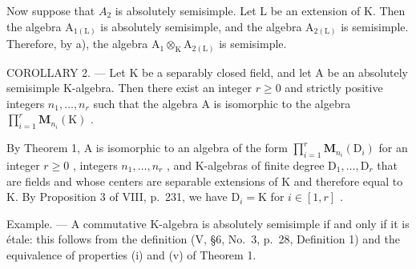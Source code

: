 Now suppose that \(A_{2}\) is absolutely semisimple. Let L be an extension of K. Then the algebra \(\mathrm{A}_{1(\mathrm{L})}\) is absolutely semisimple, and the algebra \(\mathrm{A}_{2(\mathrm{L})}\) is semisimple. Therefore, by a), the algebra \(\mathrm{A}_{1} \otimes_{\mathrm{K}} \mathrm{A}_{2(\mathrm{L})}\) is semisimple.

COROLLARY 2. --- Let K be a separably closed field, and let A be an absolutely semisimple K-algebra. Then there exist an integer \(r \geqslant 0\) and strictly positive integers \(n_{1}, \ldots, n_{r}\) such that the algebra A is isomorphic to the algebra \(\prod_{i=1}^{r} \mathbf{M}_{n_{i}}(\mathrm{K})\) .

By Theorem 1, A is isomorphic to an algebra of the form \(\prod_{i=1}^{r} \mathbf{M}_{n_i}(\mathrm{D}_i)\) for an integer \(r \geqslant 0\) , integers \(n_1, \ldots, n_r\) , and K-algebras of finite degree \(\mathrm{D}_1, \ldots, \mathrm{D}_r\) that are fields and whose centers are separable extensions of K and therefore equal to K. By Proposition 3 of VIII, p.~231, we have \(\mathrm{D}_i = \mathrm{K}\) for \(i \in [1, r]\) .

Example. --- A commutative K-algebra is absolutely semisimple if and only if it is étale: this follows from the definition (V, §6, No.~3, p.~28, Definition 1) and the equivalence of properties (i) and (v) of Theorem 1.

